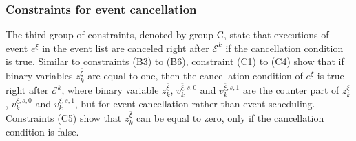 \documentclass[]{interact}
\theoremstyle{plain}%
\theoremstyle{definition}
\theoremstyle{remark}
\begin{document}

\subsubsection{Constraints for event cancellation}\label{sec:const_D}
The third group of constraints, denoted by group C, state that executions of event $e^{\xi}$ in the event list are canceled right after $\mathcal{E}^k$ if the cancellation condition is true. Similar to constraints (B3) to (B6), constraint (C1) to (C4) show that if binary variables $z^{\bar{\xi}}_{k}$ are equal to one, then the cancellation condition of $e^{\xi}$ is true right after $\mathcal{E}^k$, where binary variable $z^{\bar{\xi}}_{k}$, $v^{\bar{\xi},s,0}_k$ and $v^{\bar{\xi},s,1}_k$ are the counter part of $z^{\xi}_{k}$, $v^{\xi,s,0}_k$ and $v^{\xi,s,1}_k$, but for event cancellation rather than event scheduling. %
Constraints (C5) show that $z^{\bar{\xi}}_{k}$ can be equal to zero, only if the cancellation condition is false. 
\end{document}

